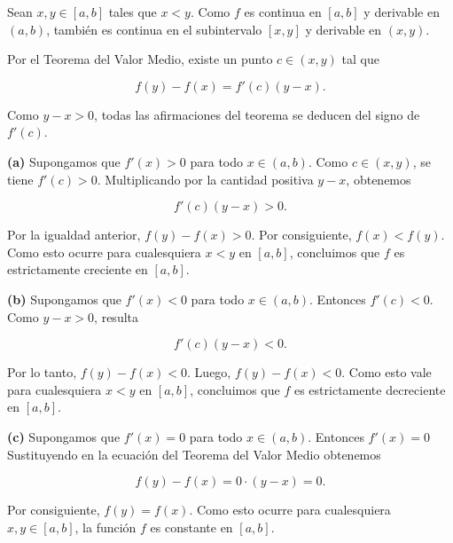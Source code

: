 \begin{prueba}
    Sean $x,y\in[a,b]$ tales que $x<y$. Como $f$ es continua en $[a,b]$ y derivable en $(a,b)$, también es continua en el subintervalo $[x,y]$ y derivable en $(x,y)$.

Por el Teorema del Valor Medio, existe un punto $c\in(x,y)$ tal que

\[
f(y)-f(x)=f'(c)(y-x).
\]

Como $y-x>0$, todas las afirmaciones del teorema se deducen del signo de $f'(c)$.

\medskip

\textbf{(a)} Supongamos que $f'(x)>0$ para todo $x\in(a,b)$. Como $c\in(x,y)$, se tiene $f'(c)>0.$ Multiplicando por la cantidad positiva $y-x$, obtenemos

\[
f'(c)(y-x)>0.
\]

Por la igualdad anterior, $f(y)-f(x)>0.$ Por consiguiente, $f(x)<f(y).$ Como esto ocurre para cualesquiera $x<y$ en $[a,b]$, concluimos que $f$ es estrictamente creciente en $[a,b]$.

\medskip

\textbf{(b)} Supongamos que $f'(x)<0$ para todo $x\in(a,b)$. Entonces $f'(c)<0.$ Como $y-x>0$, resulta

\[
f'(c)(y-x)<0.
\]

Por lo tanto, $f(y)-f(x)<0.$ Luego, $f(y)-f(x)<0.$ Como esto vale para cualesquiera $x<y$ en $[a,b]$, concluimos que $f$ es estrictamente decreciente en $[a,b]$.

\medskip

\textbf{(c)} Supongamos que $f'(x)=0$ para todo $x\in(a,b)$. Entonces $f'(x)=0$ Sustituyendo en la ecuación del Teorema del Valor Medio obtenemos

\[
f(y)-f(x)=0\cdot (y-x)=0.
\]

Por consiguiente, $f(y)=f(x).$
Como esto ocurre para cualesquiera $x,y\in[a,b]$, la función $f$ es constante en $[a,b]$.
\end{prueba}

